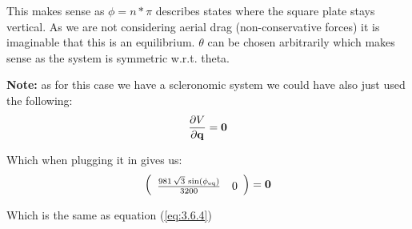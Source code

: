 

This makes sense as $\phi = n*\pi$ describes states where the square plate stays vertical. As we are not considering aerial drag (non-conservative forces) it is imaginable that this is an equilibrium. $\theta$ can be chosen arbitrarily which makes sense as the system is symmetric w.r.t. theta.

\textbf{Note:} as for this case we have a scleronomic system we could have also just used the following:
\begin{equation}
    \begin{split}
        \frac{\partial V}{\partial \text{\textbf{q}}} = \text{\textbf{0}}
    \end{split}
\end{equation}

Which when plugging it in gives us:
\begin{equation}
    \left(\begin{array}{cc} \frac{981\,\sqrt{3}\,\sin\left(\phi _{\mathrm{eq}}\right)}{3200} & 0 \end{array}\right) = \text{\textbf{0}}
\end{equation}

Which is the same as equation (\ref{eq:3.6.4})


